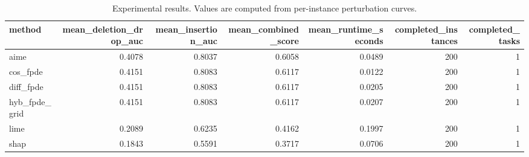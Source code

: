 \begin{table}[t]
\caption{Experimental results. Values are computed from per-instance perturbation curves.}
\label{tab:main_results_computed}
\centering
\begin{tabular}{lrrrrrr}
\toprule
method & mean\_deletion\_drop\_auc & mean\_insertion\_auc & mean\_combined\_score & mean\_runtime\_seconds & completed\_instances & completed\_tasks \\
\midrule
aime & 0.4078 & 0.8037 & 0.6058 & 0.0489 & 200 & 1 \\
cos\_fpde & 0.4151 & 0.8083 & 0.6117 & 0.0122 & 200 & 1 \\
diff\_fpde & 0.4151 & 0.8083 & 0.6117 & 0.0205 & 200 & 1 \\
hyb\_fpde\_grid & 0.4151 & 0.8083 & 0.6117 & 0.0207 & 200 & 1 \\
lime & 0.2089 & 0.6235 & 0.4162 & 0.1997 & 200 & 1 \\
shap & 0.1843 & 0.5591 & 0.3717 & 0.0706 & 200 & 1 \\
\bottomrule
\end{tabular}

\end{table}
